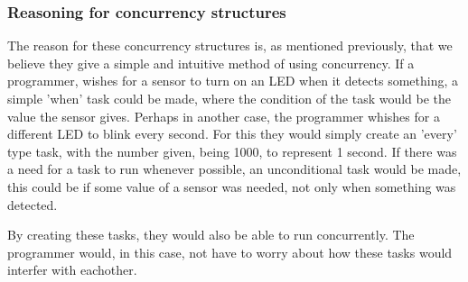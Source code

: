 \subsubsection{Reasoning for concurrency structures}
The reason for these concurrency structures is, as mentioned previously, that we believe they give a simple and intuitive method of using concurrency. If a programmer, wishes for a sensor to turn on an LED when it detects something, a simple 'when' task could be made, where the condition of the task would be the value the sensor gives. Perhaps in another case, the programmer whishes for a different LED to blink every second. For this they would simply create an 'every' type task, with the number given, being 1000, to represent 1 second. If there was a need for a task to run whenever possible, an unconditional task would be made, this could be if some value of a sensor was needed, not only when something was detected.

By creating these tasks, they would also be able to run concurrently. The programmer would, in this case, not have to worry about how these tasks would interfer with eachother.
